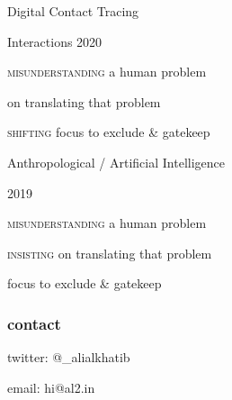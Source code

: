 \documentclass[aspectratio=43,17pt]{beamer} %
\begin{document}
\begin{frame}[standout]
Digital Contact Tracing

\hfill \alert{\small Interactions 2020}
\end{frame}

\begin{frame}[plain]

  \centering
  {{\scshape misunderstanding} a human problem}

  { on translating that problem}

  {{\scshape shifting} focus to exclude \& gatekeep}

\end{frame}


\begin{frame}[standout]
Anthropological / Artificial Intelligence

\hfill \alert{\small 2019}
\end{frame}

\begin{frame}[plain]

  \centering
  {{\scshape misunderstanding} a human problem}

  {{\scshape insisting} on translating that problem}

  { focus to exclude \& gatekeep}

\end{frame}




\begin{frame}[standout]


\end{frame}



\begin{frame}
    


\end{frame}

\begin{frame}\frametitle{contact}

{\LARGE
twitter: @\_alialkhatib

\vspace{2em}

email: hi@al2.in
}

\end{frame}
\end{document}

